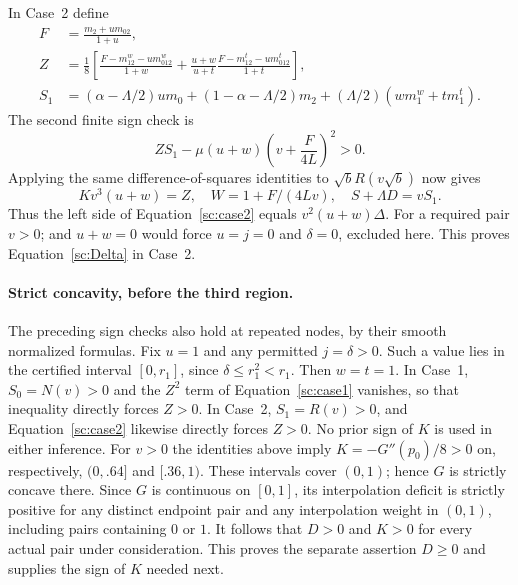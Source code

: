 In Case~2 define
\begin{align}
 F&=\frac{m_2+u m_{02}}{1+u},\nonumber\\
 Z&=\frac18\left[
 \frac{F-m^w_{12}-u m^w_{012}}{1+w}
 +\frac{u+w}{u+t}\frac{F-m^t_{12}-u m^t_{012}}{1+t}
 \right],\label{sc:case2-data}\\
 S_1&=(\alpha-\Lambda/2)u m_0
       +(1-\alpha-\Lambda/2)m_2
       +(\Lambda/2)(w m^w_1+t m^t_1).\nonumber
\end{align}
The second finite sign check is
\begin{equation}\label{sc:case2}
 ZS_1-\mu(u+w)\left(v+\frac F{4L}\right)^2>0.
\end{equation}
Applying the same difference-of-squares identities to
$\sqrt b R(v\sqrt b)$ now gives
\[
 Kv^3(u+w)=Z,\quad W=1+F/(4Lv),\quad S+\Lambda D=vS_1.
\]
Thus the left side of Equation~\eqref{sc:case2} equals $v^2(u+w)\Delta$.
For a required pair $v>0$; and $u+w=0$ would force $u=j=0$ and
$\delta=0$, excluded here.  This proves Equation~\eqref{sc:Delta} in Case~2.

\paragraph{Strict concavity, before the third region.}
The preceding sign checks also hold at repeated nodes, by their smooth
normalized formulas.  Fix $u=1$ and any permitted $j=\delta>0$. Such a value lies in the
certified interval $[0,r_1]$, since $\delta\le r_1^2<r_1$.
Then $w=t=1$.  In Case~1, $S_0=N(v)>0$ and the $Z^2$ term of
Equation~\eqref{sc:case1} vanishes, so that inequality directly forces $Z>0$.
In Case~2, $S_1=R(v)>0$, and Equation~\eqref{sc:case2} likewise directly forces
$Z>0$.  No prior sign of $K$ is used in either inference.
For $v>0$ the identities above imply
$K=-G''(p_0)/8>0$ on, respectively, $(0,.64]$ and $[.36,1)$.
These intervals cover $(0,1)$; hence $G$ is strictly concave there.
Since $G$ is continuous on $[0,1]$, its interpolation deficit is strictly
positive for any distinct endpoint pair and any interpolation weight in
$(0,1)$, including pairs containing $0$ or $1$.
It follows that $D>0$ and $K>0$ for every actual pair under consideration.
This proves the separate assertion $D\geq0$ and supplies the sign of $K$
needed next.

